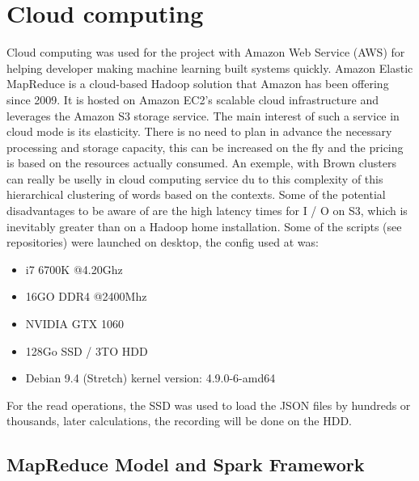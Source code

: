 \documentclass{acmtog} %
\begin{document}
\section{Cloud computing}
\label{sec:cloud}

Cloud computing was used for the project with Amazon Web Service (AWS) for helping developer making machine learning built systems quickly. 
Amazon Elastic MapReduce is a cloud-based Hadoop solution that Amazon has been offering since 2009. It is hosted on Amazon EC2's scalable cloud infrastructure and leverages the Amazon S3 storage service. The main interest of such a service in cloud mode is its elasticity. There is no need to plan in advance the necessary processing and storage capacity, this can be increased on the fly and the pricing is based on the resources actually consumed. An exemple, with Brown clusters can really be uselly \cite{Marquez16} in cloud computing service du to this complexity of this hierarchical clustering of words based on the contexts.
Some of the potential disadvantages to be aware of are the high latency times for I / O on S3, which is inevitably greater than on a Hadoop home installation. Some of the scripts (see repositories) were launched on desktop, the config used at was:
\begin{itemize}
\item  i7 6700K @4.20Ghz
\item  16GO DDR4 @2400Mhz
\item  NVIDIA GTX 1060
\item  128Go SSD / 3TO HDD
\item  Debian 9.4 (Stretch) kernel version: 4.9.0-6-amd64
\end{itemize}

For the read operations, the SSD was used to load the JSON files by hundreds or thousands, later calculations, the recording will be done on the HDD.

\subsection{MapReduce Model and Spark Framework}
\label{subsub:mapreduce_spark}
\end{document}
